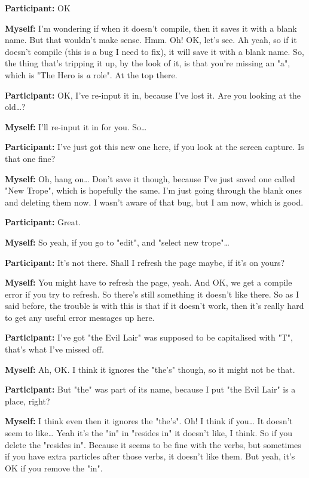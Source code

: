 \documentclass[11pt]{report}
\newcommand{\llabel}[1]{\hypertarget{llineno:#1}{\linelabel{#1}}}
\begin{document}
\begin{linenumbers}
\textbf{Participant:} OK

\textbf{Myself:} I'm wondering if when it doesn't compile, then it saves it with a blank name. But that wouldn't make sense. Hmm. Oh! OK, let's see. Ah yeah, so if it doesn't compile (this is a bug I need to fix), it will save it with a blank name. So, the thing that's tripping it up, by the look of it, is that you're missing an "a", which is "The Hero is \emph{a} role". At the top there.

\textbf{Participant:} OK, I've re-input it in, because I've lost it. Are you looking at the old\ldots{}?

\textbf{Myself:} I'll re-input it in for you. So\ldots{}

\textbf{Participant:} I've just got this new one here, if you look at the screen capture. Is that one fine?

\textbf{Myself:} Oh, hang on\ldots{} Don't save it though, because I've just saved one called "New Trope", which is hopefully the same. I'm just going through the blank ones and deleting them now. I wasn't aware of that bug, but I am now, which is good.

\textbf{Participant:} Great.

\textbf{Myself:} So yeah, if you go to "edit", and "select new trope"\ldots{}

\textbf{Participant:} It's not there. Shall I refresh the page maybe, if it's on yours?

\textbf{Myself:} You might have to refresh the page, yeah. And OK, we get a compile error if you try to refresh. So there's still something it doesn't like there. So as I said before, the trouble is with this is that if it doesn't work, then it's really hard to get any useful error messages up here.

\textbf{Participant:} I've got "the Evil Lair" was supposed to be capitalised
with "T", that's what I've missed off.\llabel{lne:syntax3a}

\textbf{Myself:} Ah, OK. I think it ignores the "the's" though, so it might not be that.

\textbf{Participant:} But "the" was part of its name, because I put "the Evil Lair" is a place, right?

\textbf{Myself:} I think even then it ignores the "the's". Oh! I think if you\ldots{} It doesn't seem to like\ldots{} Yeah it's the "in" in "resides in" it doesn't like, I think. So if you delete the "resides in". Because it seems to be fine with the verbs, but sometimes if you have extra particles after those verbs, it doesn't like them. But yeah, it's OK if you remove the "in".


\end{linenumbers}
\end{document}

